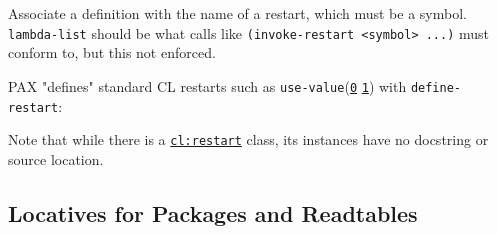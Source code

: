 \begin{itemize}
  Associate a definition with the name of a restart, which must be a
  symbol. \texttt{lambda-list} should be what calls like
  \texttt{(invoke-restart\ \textquotesingle{}\textless{}symbol\textgreater{}\ ...)}
  must conform to, but this not enforced.

  PAX "defines" standard CL restarts such as
  \texttt{use-value}(\href{http://www.lispworks.com/documentation/HyperSpec/Body/f_abortc.htm}{\texttt{0}}
  \href{http://www.lispworks.com/documentation/HyperSpec/Body/r_use_va.htm}{\texttt{1}})
  with \texttt{define-restart}:

\begin{Shaded}
\begin{Highlighting}[]
 \NormalTok{))))}
\OperatorTok{=\textgreater{}} 
\end{Highlighting}
\end{Shaded}

  Note that while there is a
  \href{http://www.lispworks.com/documentation/HyperSpec/Body/t_rst.htm}{\texttt{cl:restart}}
  class, its instances have no docstring or source location.
\end{itemize}

\subsection{Locatives for Packages and
Readtables}\label{locatives-for-packages-and-readtables}

\label{x-28DREF-3A-40PACKAGELIKE-LOCATIVES-20MGL-PAX-3ASECTION-29}

